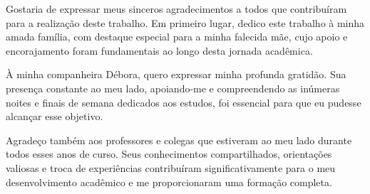 
\imprimircapa

\imprimirfolhaderosto



\begin{agradecimentos}
Gostaria de expressar meus sinceros agradecimentos a todos que contribuíram para a realização deste trabalho. Em primeiro lugar, dedico este trabalho à minha amada família, com destaque especial para a minha falecida mãe, cujo apoio e encorajamento foram fundamentais ao longo desta jornada acadêmica.

À minha companheira Débora, quero expressar minha profunda gratidão. Sua presença constante ao meu lado, apoiando-me e compreendendo as inúmeras noites e finais de semana dedicados aos estudos, foi essencial para que eu pudesse alcançar esse objetivo.

Agradeço também aos professores e colegas que estiveram ao meu lado durante todos esses anos de curso. Seus conhecimentos compartilhados, orientações valiosas e troca de experiências contribuíram significativamente para o meu desenvolvimento acadêmico e me proporcionaram uma formação completa.



\end{agradecimentos}


\begin{comment}
Epígrafe (Não se escreve a palavra epígrafe). Elemento opcional. 
A epígrafe deve ser colocada após o agradecimento; trata-se de uma citação, seguida de indicação de autoria, relacionada à matéria tratada no corpo do trabalho. Deve ser “[...] elaborada conforme a NBR 10520 [...]. Podem também constar epígrafes nas folhas ou páginas de abertura das seções primárias” (ABNT, 2002, p. 7). 
A fonte da epígrafe deve sempre ser mencionada nas referências. 

Citação direta até 3 linhas deve estar entre aspas e em parágrafo normal (vá até a janela de Estilo - selecione - Parágrafo), se tiver mais de 3 linhas, deve ser recuada 4 cm da margem esquerda, com fonte menor que 12 e espaçamento entre linhas simples 
\end{comment}

